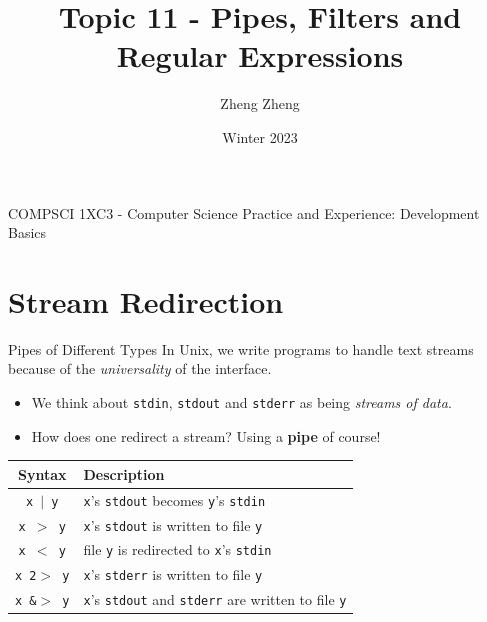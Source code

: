 \documentclass[11pt]{beamer}
\author{Zheng Zheng}
\title{Topic 11 - Pipes, Filters and Regular Expressions }
\institute{McMaster University}
\date{Winter 2023}
\begin{document}
\begin{frame}
\center
COMPSCI 1XC3 - Computer Science Practice and Experience:
Development Basics
\titlepage
\end{frame}

\begin{frame}
\tableofcontents
\end{frame}

\section[Pipes]{Stream Redirection}
\begin{frame}{Pipes of Different Types}
In Unix, we write programs to handle text streams because of the \emph{universality} of the interface.  
\begin{itemize}
\item We think about \texttt{stdin}, \texttt{stdout} and \texttt{stderr} as being \emph{streams of data}. 
\item How does one redirect a stream?  Using a \textbf{pipe} of course! 
\end{itemize}
\center
\begin{tabular}{| c | l |}
\hline 
Syntax & Description \\ \hline
\texttt{x $|$ y} & \texttt{x}'s \texttt{stdout} becomes  \texttt{y}'s \texttt{stdin}\\ \hline
\texttt{x $>$ y} & \texttt{x}'s \texttt{stdout} is written to file \texttt{y} \\ \hline
\texttt{x $<$ y} & file \texttt{y} is redirected to \texttt{x}'s \texttt{stdin} \\ \hline
\texttt{x 2$>$ y} & \texttt{x}'s \texttt{stderr} is written to file \texttt{y} \\ \hline 
\texttt{x \&$>$ y} & \texttt{x}'s \texttt{stdout} and \texttt{stderr} are written to file \texttt{y} \\ \hline 
\end{tabular}

\end{frame}
\end{document}
